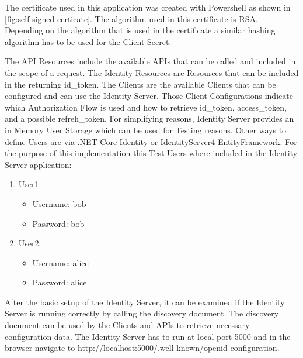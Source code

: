 The certificate used in this application was created with Powershell as shown in \ref{fig:self-signed-certicate}. The algorithm used in this certificate is RSA. Depending on the algorithm that is used in the certificate a similar hashing algorithm has to be used for the Client Secret.


The API Resources include the available APIs that can be called and included in the scope of a request. The Identity Resources are Resources that can be included in the returning id\_token. The Clients are the available Clients that can be configured and can use the Identity Server. Those Client Configurations indicate which Authorization Flow is used and how to retrieve id\_token, access\_token, and a possible refreh\_token. For simplifying reasons, Identity Server provides an in Memory User Storage which can be used for Testing reasons. Other ways to define Users are via .NET Core Identity or IdentityServer4 EntityFramework. For the purpose of this implementation this Test Users where included in the Identity Server application:
\begin{enumerate}
	\item User1:
	\begin{itemize}
		\item  Username: bob
		\item  Password: bob
	\end{itemize} 
	\item User2:
	\begin{itemize}
		\item  Username: alice
		\item  Password: alice
	\end{itemize} 
\end{enumerate}

After the basic setup of the Identity Server, it can be examined if the Identity Server is running correctly by calling the discovery document. The discovery document can be used by the Clients and APIs to retrieve necessary configuration data. The Identity Server has to run at local port 5000 and in the browser navigate to
\url{http://localhost:5000/.well-known/openid-configuration}.

